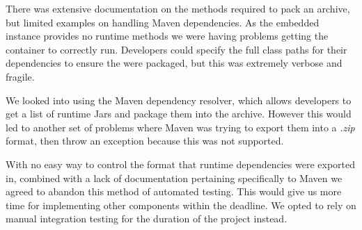 \par
There was extensive documentation on the methods required to pack an archive, but limited examples on handling Maven dependencies. As the embedded instance provides no runtime methods we were having problems getting the container to correctly run. Developers could specify the full class paths for their dependencies to ensure the were packaged, but this was extremely verbose and fragile.

\par
We looked into using the Maven dependency resolver, which allows developers to get a list of runtime Jars and package them into the archive. However this would led to another set of problems where Maven was trying to export them into a \textit{.zip} format, then throw an exception because this was not supported.

\par
With no easy way to control the format that runtime dependencies were exported in, combined with a lack of documentation pertaining specifically to Maven we agreed to abandon this method of automated testing. This would give us more time for implementing other components within the deadline. We opted to rely on manual integration testing for the duration of the project instead.
